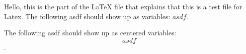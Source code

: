 \documentclass{article}
\begin{document}
  Hello, this is the part of the LaTeX file that explains that this is a test file for Latex.
  The following asdf should show up as variables: $asdf$.
  
  
  The following asdf should show up as centered variables: \[asdf\].
\end{document}
